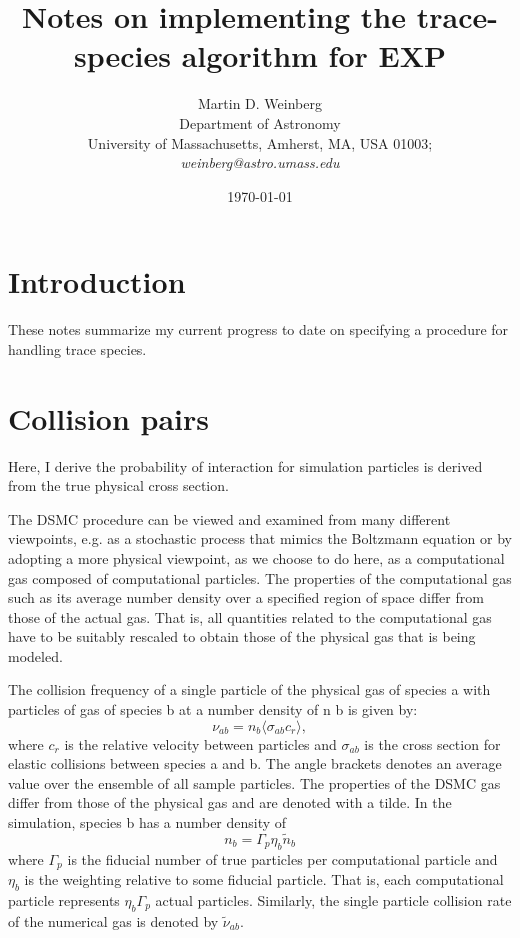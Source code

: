 \documentclass[12pt]{article}
\begin{document}
\title{Notes on implementing the trace-species algorithm for EXP}

\author{Martin D. Weinberg\\
  Department of Astronomy\\
  University of Massachusetts, Amherst, MA, USA 01003;\\
  {\it weinberg@astro.umass.edu}
}

\date{\today}

\maketitle

\tableofcontents

\section{Introduction}
\label{sec:intro}

These notes summarize my current progress to date on specifying a
procedure for handling trace species.

\section{Collision pairs}
\label{sec:background}

Here, I derive the probability of interaction for simulation particles
is derived from the true physical cross section.

The DSMC procedure can be viewed and examined from many different
viewpoints, e.g. as a stochastic process that mimics the Boltzmann
equation or by adopting a more physical viewpoint, as we choose to do
here, as a computational gas composed of computational particles. The
properties of the computational gas such as its average number density
over a specified region of space differ from those of the actual
gas. That is, all quantities related to the computational gas have to
be suitably rescaled to obtain those of the physical gas that is being
modeled. 

The
collision frequency of a single particle of the physical gas of
species a with particles of gas of species b at a number density of n
b is given by: 
\begin{equation}
  \nu_{ab} = n_b \langle{\sigma_{ab} c_r}\rangle, 
\end{equation}
where $c_r$ is the relative velocity between particles and
$\sigma_{ab}$ is the cross section for elastic collisions between
species a and b. The angle brackets denotes an average value over the
ensemble of all sample particles. The properties of the DSMC gas
differ from those of the physical gas and are denoted with a tilde. In
the simulation, species b has a number density of
\begin{equation}
n_b = \Gamma_p \eta_b {\tilde n}_b
\end{equation}
where $\Gamma_p$ is the fiducial number of true particles per
computational particle and $\eta_b$ is the weighting relative to some
fiducial particle.  That is, each computational particle represents
$\eta_b\Gamma_p$ actual particles. Similarly, the single particle
collision rate of the numerical gas is denoted by ${\tilde\nu}_{ab}$.
\end{document}
